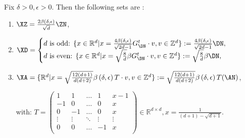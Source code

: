 \begin{thm}
  Fix $\delta>0,\epsilon>0$. Then the following sets are \decomp:
  \begin{enumerate}
      \item $\XZ=\frac{2\beta\left(\delta,\epsilon\right)}{\sqrt{d}}\ZN$,
      \item $\XD=
      \begin{cases}
        d\text{ is odd: }
        \{x\in\mathbb{R}^d|x=\frac{4\beta\left(\delta,\epsilon\right)}{\sqrt{2d-1}}G_{\DN}^t\cdot v,v\in\mathbb{Z}^d\}:=\frac{4\beta\left(\delta,\epsilon\right)}{\sqrt{2d-1}}\DN,\\
        d\text{ is even: }
        \{x\in\mathbb{R}^d|x=\sqrt{\frac{8}{d}}\beta G_{\DN}^t\cdot v,v\in\mathbb{Z}^d\}:=\sqrt{\frac{8}{d}}\beta\DN,
      \end{cases}$
      \item $\XA=\{\mathbb{R}^d|x=\sqrt{\frac{12\left(d+1\right)}{d\left(d+2\right)}}\beta\left(\delta,\epsilon\right) T\cdot v,v\in\mathbb{Z}^d\}:=\sqrt{\frac{12\left(d+1\right)}{d\left(d+2\right)}}\beta\left(\delta,\epsilon\right) T(\AN)$,
      
      
      with:
      $T=\begin{pmatrix}
                    1 &  1  & \dots & 1 & x - 1\\
                    -1 & 0  & \dots & 0 & x \\
                    0 & -1  & \dots & 0 & x \\
                    \vdots & \vdots  &  \ddots & \vdots & \vdots \\
                    0 & 0  &  \dots & -1 & x \\
                \end{pmatrix}\in \mathbb{R}^{d \times d}, x=\frac{1}{(d+1) - \sqrt{d+1}}$.
  \end{enumerate}
\end{thm}
